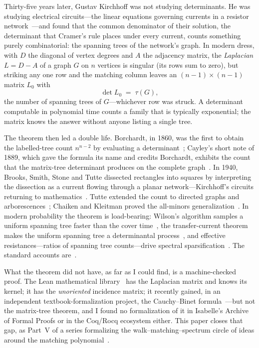 \documentclass[11pt]{article}
\begin{document}
Thirty-five years later, Gustav Kirchhoff was not studying determinants. He was studying
electrical circuits---the linear equations governing currents in a resistor
network~\cite{Kirchhoff1847}---and found that the common denominator of their solution, the
determinant that Cramer's rule places under every current, counts something purely
combinatorial: the spanning trees of the network's graph. In modern dress, with
$D$ the diagonal of vertex degrees and $A$ the adjacency matrix, the \emph{Laplacian} $L=D-A$ of
a graph $G$ on $n$ vertices is singular (its rows sum to zero), but striking any one row and the
matching column leaves an $(n-1)\times(n-1)$ matrix $L_0$ with
\[
  \det L_0 \;=\; \tau(G),
\]
the number of spanning trees of $G$---whichever row was struck. A determinant computable in
polynomial time counts a family that is typically exponential; the matrix knows the answer
without anyone listing a single tree.

The theorem then led a double life. Borchardt, in 1860, was the first to obtain the
labelled-tree count $n^{n-2}$ by evaluating a determinant~\cite{Borchardt1860}; Cayley's short
note of 1889, which gave the formula its name and credits Borchardt, exhibits the count that
the matrix-tree determinant produces on the complete graph~\cite{Cayley1889}. In 1940,
Brooks, Smith, Stone and Tutte dissected rectangles into squares by interpreting the dissection
as a current flowing through a planar network---Kirchhoff's circuits returning to
mathematics~\cite{BSST1940}. Tutte extended the count to directed graphs and
arborescences~\cite{Tutte1948}; Chaiken and Kleitman proved the all-minors
generalization~\cite{ChaikenKleitman1978,Chaiken1982}. In modern probability the theorem is
load-bearing: Wilson's algorithm samples a uniform spanning tree faster than the cover
time~\cite{Wilson1996}, the transfer-current theorem makes the uniform spanning tree a
determinantal process~\cite{BurtonPemantle1993}, and effective resistances---ratios of spanning
tree counts---drive spectral sparsification~\cite{SpielmanSrivastava2011}. The standard accounts
are~\cite{Moon1970,Biggs1993,GodsilRoyle,StanleyEC2,LyonsPeres}.

What the theorem did not have, as far as I could find, is a machine-checked proof. The Lean
mathematical library~\cite{Mathlib} has the Laplacian matrix and knows its kernel; it has the
\emph{unoriented} incidence matrix; it recently gained, in an independent textbook-formalization
project, the Cauchy--Binet formula~\cite{Grinberg,FaabianRepo}---but not the matrix-tree theorem,
and I found no formalization of it in Isabelle's Archive of Formal Proofs or in the Coq/Rocq
ecosystem either. This paper closes that gap, as Part~V of a series formalizing the
walk--matching--spectrum circle of ideas around the matching
polynomial~\cite{PartI,PartII,Bass,PartIII,PartIV}.
\end{document}
